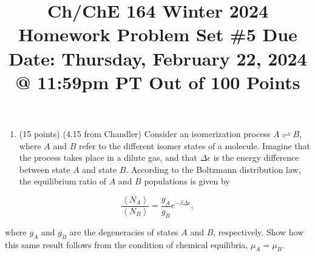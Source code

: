 \documentclass[12pt]{article}
\title{Ch/ChE 164 Winter 2024 
 Homework Problem Set \#5 
 Due Date: Thursday, February 22, 2024 @ 11:59pm PT 
 Out of 100 Points }
\author{}
\date{}
\begin{document}
\maketitle
\section{}
\begin{enumerate}
  \item (15 points) (4.15 from Chandler) Consider an isomerization process $A \rightleftharpoons B$, where $A$ and $B$ refer to the different isomer states of a molecule. Imagine that the process takes place in a dilute gas, and that $\Delta \epsilon$ is the energy difference between state $A$ and state $B$. According to the Boltzmann distribution law, the equilibrium ratio of $A$ and $B$ populations is given by
\end{enumerate}


\begin{equation*}
\frac{\left\langle N_{A}\right\rangle}{\left\langle N_{B}\right\rangle}=\frac{g_{A}}{g_{B}} e^{-\beta \Delta \epsilon}, \tag{1}
\end{equation*}


where $g_{A}$ and $g_{B}$ are the degeneracies of states $A$ and $B$, respectively. Show how this same result follows from the condition of chemical equilibria, $\mu_{A}=\mu_{B}$.
\end{document}
